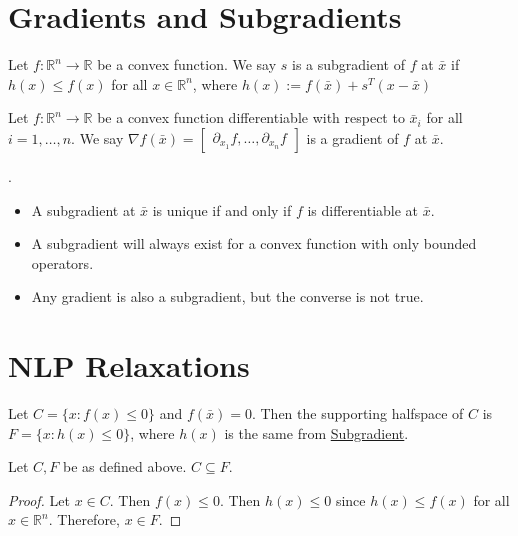 \documentclass[a4paper]{report}
\begin{document}
	\section{Gradients and Subgradients}
	\begin{definition}[Subgradient]
		\label{subgradient} Let $f : \mathbb{R}^{n} \rightarrow \mathbb{R}$ be a convex
		function. We say $s$ is a subgradient of $f$ at $\bar x$ if $h(x) \leq f(x)$
		for all $x \in \mathbb{R}^{n}$, where $h(x) := f(\bar x) + s^{T} (x - \bar x)$
	\end{definition}
	\begin{definition}[Gradient]
		Let $f : \mathbb{R}^{n} \rightarrow \mathbb{R}$ be a convex function differentiable
		with respect to $\bar x_{i}$ for all $i = 1, \dots, n$. We say
		$\nabla f(\bar x) =
		\begin{bmatrix}
			\partial_{x_1}f, \dots, \partial_{x_n}f
		\end{bmatrix}$ is a gradient of $f$ at $\bar x$.
	\end{definition}

	\begin{proposition}
		\label{prop} . \\
		\begin{itemize}
			\item A subgradient at $\bar x$ is unique if and only if $f$ is differentiable
				at $\bar x$.

			\item A subgradient will always exist for a convex function with only bounded
				operators.

			\item Any gradient is also a subgradient, but the converse is not true.
		\end{itemize}
	\end{proposition}

	\section{NLP Relaxations}
	\begin{definition}
		\label{supporting} Let $C = \{x : f(x) \leq 0\}$ and $f(\bar x) = 0$. Then the
		supporting halfspace of $C$ is $F = \{x: h(x) \leq 0 \}$, where $h(x)$ is the
		same from \hyperref[subgradient]{Subgradient}.
	\end{definition}
	\begin{proposition}
		Let $C, F$ be as defined above. $C \subseteq F$.
	\end{proposition}
	\begin{proof}
		Let $x \in C$. Then $f(x) \leq 0$. Then $h(x) \leq 0$ since $h(x) \leq f(x)$
		for all $x \in \mathbb{R}^{n}$. Therefore, $x \in F$.
	\end{proof}
\end{document}
